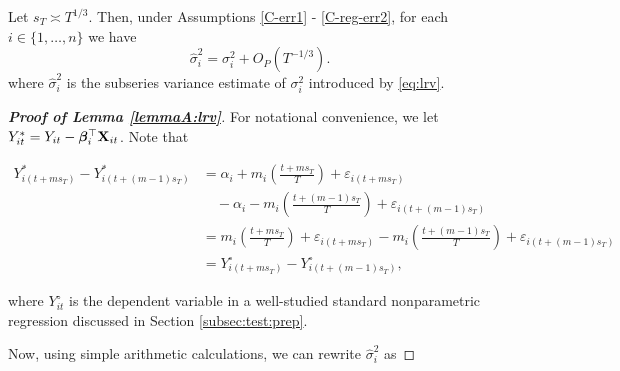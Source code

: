 \begin{lemmaA}\label{lemmaA:lrv}
Let $s_T \asymp T^{1/3}$. Then, under Assumptions \ref{C-err1} - \ref{C-reg-err2}, for each $i \in \{1, \ldots, n\}$ we have
$$\widehat{\sigma}_i^2 = \sigma_i^2 + O_P(T^{-1/3}).$$
where $\widehat{\sigma}_i^2$ is the subseries variance estimate of $\sigma_i^2$ introduced by \eqref{eq:lrv}.
\end{lemmaA}
\begin{proof}[\textnormal{\textbf{Proof of Lemma \ref{lemmaA:lrv}}}]
For notational convenience, we let $Y_{it}^* = Y_{it} - \bm{\beta}_i^\top \mathbf{X}_{it}$. Note that 
\begin{small}
\begin{align*}
Y_{i(t + ms_T)}^* - Y_{i(t + (m-1)s_T)}^* &= \alpha_i + m_i\left(\frac{t+m s_T}{T}\right) + \varepsilon_{i(t + ms_T)} \\
&\quad-  \alpha_i - m_i\left(\frac{t+(m-1) s_T}{T}\right) + \varepsilon_{i(t + (m-1)s_T)} \\
&=m_i\left(\frac{t+m s_T}{T}\right) + \varepsilon_{i(t + ms_T)}  - m_i\left(\frac{t+(m-1) s_T}{T}\right) + \varepsilon_{i(t + (m-1)s_T)}\\
& = Y_{i(t + ms_T)}^\circ - Y_{i(t + (m-1)s_T)}^\circ, 
\end{align*}
\end{small}
where $Y_{it}^\circ$ is the dependent variable in a well-studied standard nonparametric regression discussed in Section \ref{subsec:test:prep}.

Now, using simple arithmetic calculations, we can rewrite $\widehat{\sigma}_i^2$ as


\end{proof}
